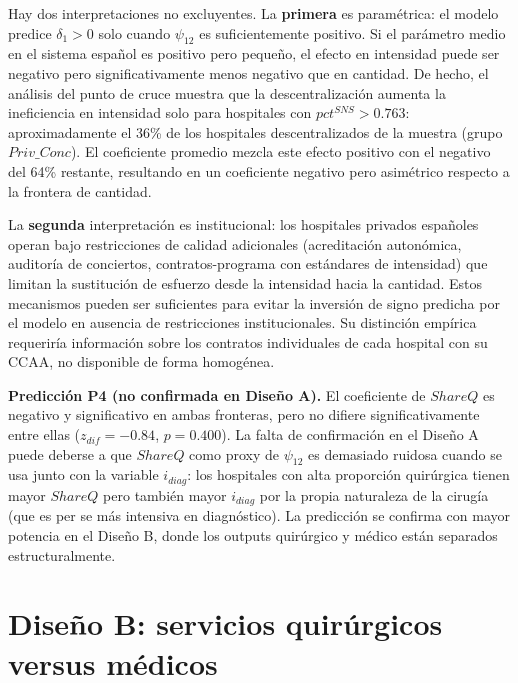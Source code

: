 \documentclass[12pt, a4paper, twoside, openright]{book}
\theoremstyle{plain}
\theoremstyle{definition}
\theoremstyle{remark}
\begin{document}
Hay dos interpretaciones no excluyentes. La \textbf{primera} es paramétrica: el modelo predice $\delta_1 > 0$ solo cuando $\psi_{12}$ es suficientemente positivo. Si el parámetro medio en el sistema español es positivo pero pequeño, el efecto en intensidad puede ser negativo pero significativamente menos negativo que en cantidad. De hecho, el análisis del punto de cruce muestra que la descentralización aumenta la ineficiencia en intensidad solo para hospitales con $pct^{SNS} > 0.763$: aproximadamente el 36\% de los hospitales descentralizados de la muestra (grupo $Priv\_Conc$). El coeficiente promedio mezcla este efecto positivo con el negativo del 64\% restante, resultando en un coeficiente negativo pero asimétrico respecto a la frontera de cantidad.

La \textbf{segunda} interpretación es institucional: los hospitales privados españoles operan bajo restricciones de calidad adicionales (acreditación autonómica, auditoría de conciertos, contratos-programa con estándares de intensidad) que limitan la sustitución de esfuerzo desde la intensidad hacia la cantidad. Estos mecanismos pueden ser suficientes para evitar la inversión de signo predicha por el modelo en ausencia de restricciones institucionales. Su distinción empírica requeriría información sobre los contratos individuales de cada hospital con su CCAA, no disponible de forma homogénea.

\textbf{Predicción P4 (no confirmada en Diseño A).} El coeficiente de $ShareQ$ es negativo y significativo en ambas fronteras, pero no difiere significativamente entre ellas ($z_{dif}=-0.84$, $p=0.400$). La falta de confirmación en el Diseño A puede deberse a que $ShareQ$ como proxy de $\psi_{12}$ es demasiado ruidosa cuando se usa junto con la variable $i_{diag}$: los hospitales con alta proporción quirúrgica tienen mayor $ShareQ$ pero también mayor $i_{diag}$ por la propia naturaleza de la cirugía (que es per se más intensiva en diagnóstico). La predicción se confirma con mayor potencia en el Diseño B, donde los outputs quirúrgico y médico están separados estructuralmente.


\section{Diseño B: servicios quirúrgicos versus médicos}
\label{sec:res_B}
\end{document}
